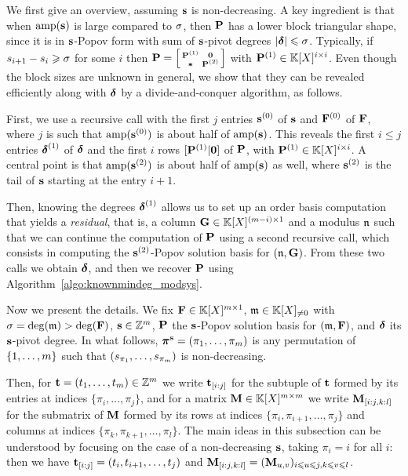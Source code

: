 \documentclass[preprint]{sig-alternate-05-2015}
\begin{document}
We first give an overview, assuming $\shifts$ is non-decreasing. A key
ingredient is that when $\amp$ is large compared to $\degMod$, then $\msb$ has
a lower block triangular shape, since it is in $\shifts$-Popov form with sum of
$\shifts$-pivot degrees $\sumVec{\minDegs} \le \degMod$. Typically, if
$\shift{i+1} - \shift{i} \ge \degMod$ for some $i$ then $\msb =
\left[\begin{smallmatrix} \msb^{(1)} & \mat{0} \\ \anyMat & \msb^{(2)}
\end{smallmatrix}\right]$ with $\msb^{(1)} \in \polMatSpace[i]$.
Even though the block sizes are unknown in general, we show that they can be
revealed efficiently along with $\minDegs$ by a divide-and-conquer algorithm,
as follows.

First, we use a recursive call with the first $j$ entries $\shifts^{(0)}$ of
$\shifts$ and $\sys^{(0)}$ of $\sys$, where $j$ is such that
$\amp[\shifts^{(0)}]$ is about half of $\amp$. This reveals the first $i\le j$
entries $\minDegs^{(1)}$ of $\minDegs$ and the first $i$ rows $[\msb^{(1)} |
\mat{0}]$ of $\msb$, with $\msb^{(1)} \in \polMatSpace[i]$. A central point is
that $\amp[\shifts^{(2)}]$ is about half of $\amp$ as well, where
$\shifts^{(2)}$ is the tail of $\shifts$ starting at the entry $i+1$.

Then, knowing the degrees $\minDegs^{(1)}$ allows us to set up an order basis
computation that yields a \emph{residual}, that is, a column $\mat{G} \in
\polMatSpace[(\nbun-i)][1]$ and a modulus $\modulus[n]$ such that we can
continue the computation of $\msb$ using a second recursive call, which
consists in computing the $\shifts^{(2)}$-Popov solution basis for
$(\modulus[n],\mat{G})$. From these two calls we obtain $\minDegs$, and then
we recover $\msb$ using Algorithm~\ref{algo:knownmindeg_modsys}.

Now we present the details. We fix $\sys \in \polMatSpace[\nbun][1]$, $\modulus
\in \modSpace$ with $\degMod = \deg(\modulus) > \deg(\sys)$, $\shifts \in
\shiftSpace$, $\msb$ the $\shifts$-Popov solution basis for $(\modulus,\sys)$,
and $\minDegs$ its $\shifts$-pivot degree. In what follows, $\perm =
(\pi_1,\ldots,\pi_\nbun)$ is any permutation of $\{1,\ldots,\nbun\}$ such that
$(\shift{\pi_1},\ldots,\shift{\pi_\nbun})$ is non-decreasing.

Then, for $\shifts[t] = (t_1,\ldots,t_\nbun) \in \ZZ^\nbun$ we write
$\subVec{\shifts[t]}{i}{j}$ for the subtuple of $\shifts[t]$ formed by its
entries at indices $\{\pi_i,\ldots,\pi_j\}$, and for a matrix $\mat{M} \in
\polMatSpace[\nbun]$ we write $\subMat{\mat{M}}{i}{j}{k}{l}$ for the submatrix
of $\mat{M}$ formed by its rows at indices $\{\pi_i,\pi_{i+1},\ldots,\pi_j\}$
and columns at indices $\{\pi_k,\pi_{k+1},\ldots,\pi_l\}$. The main ideas in
this subsection can be understood by focusing on the case of a non-decreasing
$\shifts$, taking $\pi_i = i$ for all $i$: then we have
$\subVec{\shifts[t]}{i}{j} = (t_i,t_{i+1},\ldots,t_j)$ and
$\subMat{\mat{M}}{i}{j}{k}{l} = (\mat{M}_{u,v})_{i\le u\le j,k\le v\le l}$.
\end{document}
